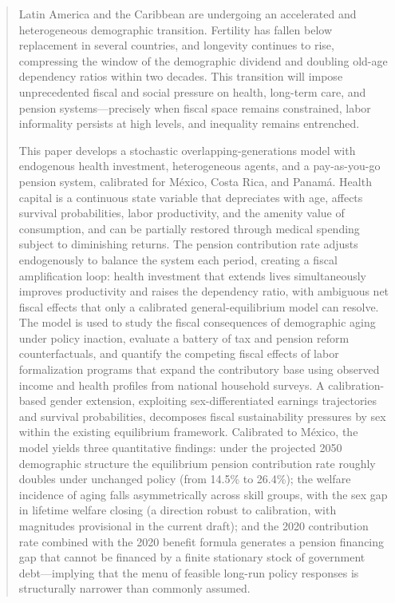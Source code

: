 \documentclass[12pt,a4paper]{article}
\begin{document}
\begin{abstract}
Latin America and the Caribbean are undergoing an accelerated and heterogeneous demographic transition. Fertility has fallen below replacement in several countries, and longevity continues to rise, compressing the window of the demographic dividend and doubling old-age dependency ratios within two decades. This transition will impose unprecedented fiscal and social pressure on health, long-term care, and pension systems---precisely when fiscal space remains constrained, labor informality persists at high levels, and inequality remains entrenched.

This paper develops a stochastic overlapping-generations model with endogenous health investment, heterogeneous agents, and a pay-as-you-go pension system, calibrated for M\'exico, Costa Rica, and Panam\'a. Health capital is a continuous state variable that depreciates with age, affects survival probabilities, labor productivity, and the amenity value of consumption, and can be partially restored through medical spending subject to diminishing returns. The pension contribution rate adjusts endogenously to balance the system each period, creating a fiscal amplification loop: health investment that extends lives simultaneously improves productivity and raises the dependency ratio, with ambiguous net fiscal effects that only a calibrated general-equilibrium model can resolve. The model is used to study the fiscal consequences of demographic aging under policy inaction, evaluate a battery of tax and pension reform counterfactuals, and quantify the competing fiscal effects of labor formalization programs that expand the contributory base using observed income and health profiles from national household surveys. A calibration-based gender extension, exploiting sex-differentiated earnings trajectories and survival probabilities, decomposes fiscal sustainability pressures by sex within the existing equilibrium framework. Calibrated to M\'exico, the model yields three quantitative findings: under the projected 2050 demographic structure the equilibrium pension contribution rate roughly doubles under unchanged policy (from 14.5\% to 26.4\%); the welfare incidence of aging falls asymmetrically across skill groups, with the sex gap in lifetime welfare closing (a direction robust to calibration, with magnitudes provisional in the current draft); and the 2020 contribution rate combined with the 2020 benefit formula generates a pension financing gap that cannot be financed by a finite stationary stock of government debt---implying that the menu of feasible long-run policy responses is structurally narrower than commonly assumed.
\end{abstract}
\end{document}
